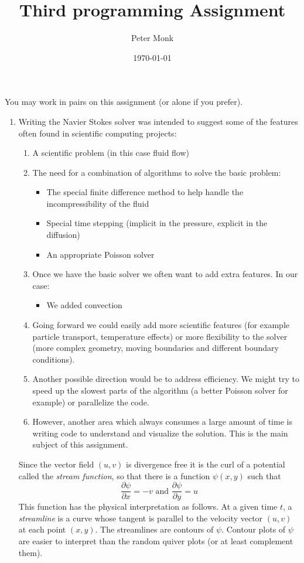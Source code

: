 \documentclass[11pt]{article}
\begin{document}
\title{Third programming Assignment}
\author{Peter Monk}
\date{\today}
\maketitle

You may work in pairs on this assignment (or alone if you prefer).  

\begin{enumerate}
\item Writing the Navier Stokes solver was intended to suggest some of the features often found in scientific computing 
projects:
\begin{enumerate}
\item A scientific problem (in this case fluid flow)
\item The need for a combination of algorithms to solve the basic problem:
\begin{itemize}
\item The special finite difference method to help handle the incompressibility of the fluid
\item Special time stepping (implicit in the pressure, explicit in the diffusion)
\item An appropriate Poisson solver
\end{itemize}
\item Once we have the basic solver we often want to add extra features. In our case:
\begin{itemize}
\item We added convection
\end{itemize}
\item Going forward we could easily add more scientific features (for example particle transport, temperature effects) or more flexibility
to the solver (more complex geometry, moving boundaries and different boundary conditions).
\item Another possible direction would be to address efficiency.  We might try to speed up the slowest parts of the algorithm (a better Poisson solver for
example) or parallelize the code.
\item However, another area which always consumes a large amount of time is writing code to understand and visualize the solution.  This is the main subject of this assignment.
\end{enumerate}
Since the vector field $(u,v)$ is divergence free it is the curl of a potential called the {\em stream function}, so that there is a function $\psi(x,y)$ such that
\[
\frac{\partial \psi}{\partial x}=-v \mbox{ and }\frac{\partial \psi}{\partial y}=u
\]
This function has the physical interpretation as follows.  At a given time $t$, a {\em streamline} is a curve whose tangent is parallel to the velocity vector $(u,v)$ at each point $(x,y)$.  The streamlines are contours of $\psi$.  Contour plots of $\psi$ are easier to interpret than the random quiver plots (or at least complement them).


\end{enumerate}
\end{document}
